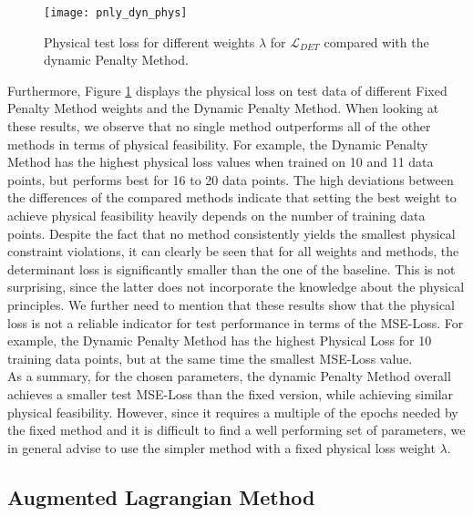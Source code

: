 \begin{figure}[H]
	\centering
	\texttt{[image: pnly\_dyn\_phys]}
	\caption{Physical test loss for different weights $\lambda$ for $\mathcal{L}_{DET}$ compared with the dynamic Penalty Method.}
	\label{fig:pnly_dyn_phys}
\end{figure}
\indent Furthermore, Figure \ref{fig:pnly_dyn_phys} displays the physical loss on test data of different Fixed Penalty Method weights and the Dynamic Penalty Method. When looking at these results, we observe that no single method outperforms all of the other methods in terms of physical feasibility. For example, the Dynamic Penalty Method has the highest physical loss values when trained on 10 and 11 data points, but performs best for 16 to 20 data points. The high deviations between the differences of the compared methods indicate that setting the best weight to achieve physical feasibility heavily depends on the number of training data points. Despite the fact that no method consistently yields the smallest physical constraint violations, it can clearly be seen that for all weights and methods, the determinant loss is significantly smaller than the one of the baseline. This is not surprising, since the latter does not incorporate the knowledge about the physical principles. We further need to mention that these results show that the physical loss is not a reliable indicator for test performance in terms of the MSE-Loss. For example, the Dynamic Penalty Method has the highest Physical Loss for 10 training data points, but at the same time the smallest MSE-Loss value.\\
\indent As a summary, for the chosen parameters, the dynamic Penalty Method overall achieves a smaller test MSE-Loss than the fixed version, while achieving similar physical feasibility. However, since it requires a multiple of the epochs needed by the fixed method and it is difficult to find a well performing set of parameters, we in general advise to use the simpler method with a fixed physical loss weight $\lambda$.

\subsection{Augmented Lagrangian Method}

